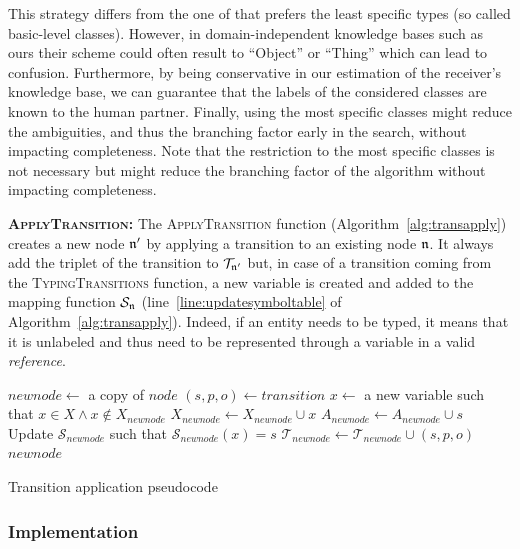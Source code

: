 \documentclass[a4paper,11pt,twoside]{StyleThese}
\begin{document}
This strategy differs from the one of \cite{dale1995computational} that prefers the least specific types (so called basic-level classes).
However, in domain-independent knowledge bases such as ours their scheme could often result to ``Object'' or ``Thing'' which can lead to confusion.
Furthermore, by being conservative in our estimation of the receiver's knowledge base, we can guarantee that the labels of the considered classes are known to the human partner.
Finally, using the most specific classes might reduce the ambiguities, and thus the branching factor early in the search, without impacting completeness.
Note that the restriction to the most specific classes is not necessary but might reduce the branching factor of the algorithm without impacting completeness.

\textbf{\textsc{ApplyTransition}:}
The \textsc{ApplyTransition} function (Algorithm~\ref{alg:transapply}) creates a new node $\mathfrak{n}'$ by applying a transition to an existing node $\mathfrak{n}$. It always add the triplet of the transition to $\mathcal{T}_{\mathfrak{n}'}$ but, in case of a transition coming from the \textsc{TypingTransitions} function, a new variable is created and added to the mapping function $\mathcal{S}_{\mathfrak{n}}$ (line~\ref{line:updatesymboltable} of Algorithm~\ref{alg:transapply}). Indeed, if an entity needs to be typed, it means that it is unlabeled and thus need to be represented through a variable in a valid \textit{reference}.

\begin{algorithm}[htb]
\begin{algorithmic}[1]
\State $newnode \leftarrow$ a copy of $node$
\State $(s, p, o) \leftarrow transition$
	\State $x \leftarrow$ a new variable such that $x \in X \land x \notin X_{newnode}$
	\State $X_{newnode} \leftarrow X_{newnode} \cup x$
	\State $A_{newnode} \leftarrow A_{newnode} \cup s$
	\State Update $\mathcal{S}_{newnode}$ such that $\mathcal{S}_{newnode}(x) = s$ \label{line:updatesymboltable}
\EndIf
\State $\mathcal{T}_{newnode} \leftarrow \mathcal{T}_{newnode} \cup (s, p, o)$
\State \Return $newnode$
\EndFunction
\end{algorithmic}
 \caption{Transition application pseudocode}
 \label{alg:transapply}
\end{algorithm}



\subsubsection{Implementation}
\end{document}
